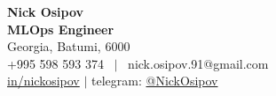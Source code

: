 \documentclass[letterpaper,12pt]{fed-res} %
\begin{document}
\begin{center}
  \textbf{\Huge Nick Osipov} \\ \vspace{1pt}
  \textbf{MLOps Engineer} \\ \vspace{1pt}
  Georgia, Batumi, 6000 \\ \vspace{1pt}
  +995 598 593 374 \ $|$ \ nick.osipov.91@gmail.com \\ \vspace{1pt}
  \href{https://www.linkedin.com/in/nickosipov/}{in/nickosipov} $|$ telegram: \href{https://t.me/NickOsipov}{@NickOsipov} \\ \vspace{1pt}
\end{center}







\end{document}
